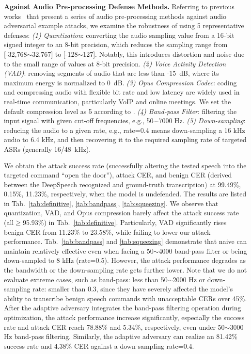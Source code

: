 \textbf{Against Audio Pre-processing Defense Methods.} 
Referring to previous works~\cite{hussain2021waveguard,deng2022fencesitter,li2020advpulse,yuan2018commandersong} that present a series of audio pre-processing methods against audio adversarial example attacks, we examine the robustness of \alias using 5 representative defenses: \textit{(1) Quantization}: converting the audio sampling value from a 16-bit signed integer to an 8-bit precision, which reduces the sampling range from [-32,768$\sim$32,767] to [-128$\sim$127]. Notably, this introduces distortion and noise due to the small range of values at 8-bit precision. \textit{(2) Voice Activity Detection (VAD)}: removing segments of audio that are less than -15~dB, where its maximum energy is normalized to 0~dB. \textit{(3) Opus Compression Codec}: coding and compressing audio with flexible bit rate and low latency are widely used in real-time communication, particularly VoIP and online meetings. We set the default compression level as 5 according to \cite{torch_codec}. \textit{(4) Band-pass Filter}: filtering the input signal with given cut-off frequencies, e.g., 50$\sim$7000 Hz. \textit{(5) Down-sampling}: reducing the audio to a given rate, e.g., rate=0.4 means down-sampling a 16 kHz audio to 6.4 kHz, and then recovering it to the required sampling rate of targeted ASRs (generally 16/48~kHz).

We obtain the attack success rate (successfully altering the tested speech into the targeted command ``open the door''), attack CER, and benign CER (derived between the DeepSpeech recognized and ground-truth transcription) at 99.49\%, 0.15\%, 11.23\%, respectively, when the model is undefended.
The results are listed in Tab.~\ref{tab:definitive}, \ref{tab:bandpass}, \ref{tab:squeezing}. We observe that quantization, VAD, and Opus compression barely affect the attack success rate (all$\ge$95.93\%) in Tab.~\ref{tab:definitive}. Particularly, VAD significantly rises benign CER from 11.23\% to 23.58\%, while failing to lower our attack performance. Tab.~\ref{tab:bandpass} and \ref{tab:squeezing} demonstrate that naive \alias can maintain relatively effective even when facing a 50$\sim$4000 band-pass filter or being down-sampled to 8 kHz (rate=0.5). However, the attack performance degrades as the bandwidth or the down-sampling rate gets further lower. Note that we do not evaluate extreme cases, such as band-pass: less than 50$\sim$2000 Hz or down-sampling rate: smaller than 0.3, since they have severely affected the model's ability to transcribe benign speech commands with unacceptable CERs over 45\%. After the adaptive adversary integrates the band-pass filtering operation during optimization, the attack performance increase significantly, especially the success rate and attack CER reach 78.88\% and 5.34\%, respectively, even under 50$\sim$3000 Hz band-pass filtering. Similarly, the adaptive adversary can realize an 81.42\% success rate and 4.38\% CER against a down-sampling rate=0.4.


